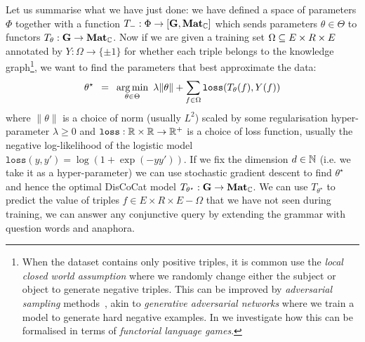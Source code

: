 Let us summarise what we have just done: we have defined a space of parameters $\Phi$ together with a function $T_- : \Phi \to [\mathbf{G}, \mathbf{Mat}_{\mathbb{C}}]$ which sends parameters $\theta \in \Theta$ to functors $T_\theta : \mathbf{G} \to \mathbf{Mat}_{\mathbb{C}}$.
Now if we are given a training set $\Omega \subseteq E \times R \times E$ annotated by $Y : \Omega \to \{ \pm 1 \}$ for whether each triple belongs to the knowledge graph\footnote
{When the dataset contains only positive triples, it is common use the \emph{local closed world assumption} where we randomly change either the subject or object to generate negative triples.
This can be improved by \emph{adversarial sampling} methods~\cite{CaiWang18}, akin to \emph{generative adversarial networks} where we train a model to generate hard negative examples.
In \cite{FeliceEtAl20} we investigate how this can be formalised in terms of \emph{functorial language games}.},
we want to find the parameters that best approximate the data:
$$
\theta^\star \enspace = \enspace \operatorname*{arg\,min}_{\theta \in \Theta} \
\lambda \lVert \theta \rVert + \sum_{f \in \Omega} \mathtt{loss}(T_\theta(f), Y(f))
$$
where $\lVert \theta \rVert$ is a choice of norm (usually $L^2$) scaled by some regularisation hyper-parameter $\lambda \geq 0$ and $\mathtt{loss} : \mathbb{R} \times \mathbb{R} \to \mathbb{R}^+$ is a choice of loss function, usually the negative log-likelihood of the logistic model $\mathtt{loss}(y, y') = \log (1 + \exp(-yy'))$.
If we fix the dimension $d \in \mathbb{N}$ (i.e. we take it as a hyper-parameter) we can use stochastic gradient descent to find $\theta^\star$ and hence the optimal DisCoCat model $T_{\theta^\star} : \mathbf{G} \to \mathbf{Mat}_{\mathbb{C}}$.
We can use $T_{\theta^\star}$ to predict the value of triples $f \in E \times R \times E - \Omega$ that we have not seen during training, we can answer any conjunctive query by extending the grammar with question words and anaphora.
